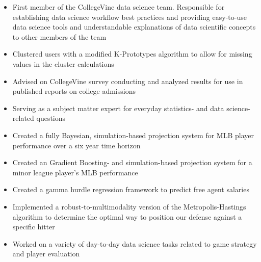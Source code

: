 \documentclass[10pt,a4paper,ragged2e,withhyper]{/Users/matt/Google Drive/GitHub/mrkaye97.github.io/resume/altacv}
\begin{document}
	\begin{paracol}{2}
	
		\begin{itemize}
		\item First member of the CollegeVine data science team. Responsible for establishing data science workflow best practices and providing easy-to-use data science tools and understandable explanations of data scientific concepts to other members of the team
		\item Clustered users with a modified K-Prototypes algorithm to allow for missing values in the cluster calculations
		\item Advised on CollegeVine survey conducting and analyzed results for use in published reports on college admissions
		\item Serving as a subject matter expert for everyday statistics- and data science-related questions
		\end{itemize}
		
		\divider
		
		\begin{itemize}
		\item Created a fully Bayesian, simulation-based projection system for MLB player performance over a six year time horizon
		\item Created an Gradient Boosting- and simulation-based projection system for a minor league player's MLB performance
		\item Created a gamma hurdle regression framework to predict free agent salaries
		\item Implemented a robust-to-multimodality version of the Metropolis-Hastings algorithm to determine the optimal way to position our defense against a specific hitter
		\item Worked on a variety of day-to-day data science tasks related to game strategy and player evaluation
		\end{itemize}
		

\end{paracol}
\end{document}
